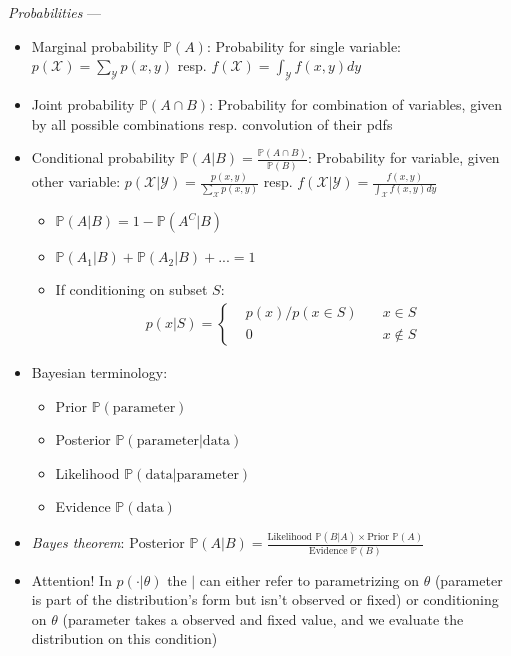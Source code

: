 \emph{Probabilities} --- 
\begin{itemize}
    \item Marginal probability $\mathbb{P}(A)$: Probability for single variable: $p(\mathcal{X}) = \sum_{\mathcal{Y}}p(x,y)$ resp. $f(\mathcal{X}) = \int_{\mathcal{Y}}f(x,y)dy$
    \item Joint probability $\mathbb{P}(A \cap B)$: Probability for combination of variables, given by all possible combinations resp. convolution of their pdfs 
    \item Conditional probability $\mathbb{P}(A|B) = \frac{\mathbb{P}(A \cap B)}{\mathbb{P}(B)}$: Probability for variable, given other variable: $p(\mathcal{X}|\mathcal{Y}) = \frac{p(x,y)}{\sum_{\mathcal{X}}p(x,y)}$ resp. $f(\mathcal{X}|\mathcal{Y}) = \frac{f(x,y)}{\int_{\mathcal{X}}f(x,y)dy}$
    \begin{itemize}
        \item $\mathbb{P}(A|B) = 1 - \mathbb{P}(A^C|B)$
        \item $\mathbb{P}(A_1|B) + \mathbb{P}(A_2|B) + ... = 1$
        \item If conditioning on subset $S$:
        \begin{align*}
        p(x | S) = 
        \left\{
            \begin{aligned}
                 & p(x) / p(x \in S) \quad & x \in S \\ 
                 & 0 \quad & x \notin S  
            \end{aligned}
        \right.
        \end{align*}
    \end{itemize}
    \item Bayesian terminology: 
    \begin{itemize}
        \item Prior $\mathbb{P}(\textrm{parameter})$
        \item Posterior $\mathbb{P}(\textrm{parameter} | \textrm{data})$
        \item Likelihood $\mathbb{P}(\textrm{data} | \textrm{parameter})$
        \item Evidence $\mathbb{P}(\textrm{data})$
    \end{itemize}
    \item \emph{Bayes theorem}: $\textrm{Posterior } \mathbb{P}(A|B) = \frac{\textrm{Likelihood }\mathbb{P}(B|A) \times  \textrm{Prior }\mathbb{P}(A)}{\textrm{Evidence }\mathbb{P}(B)}$
    \item Attention! In $p(\cdot | \theta)$ the $|$ can either refer to parametrizing on $\theta$ (parameter is part of the distribution's form but isn't observed or fixed) or conditioning on $\theta$ (parameter takes a observed and fixed value, and we evaluate the distribution on this condition)
\end{itemize}

